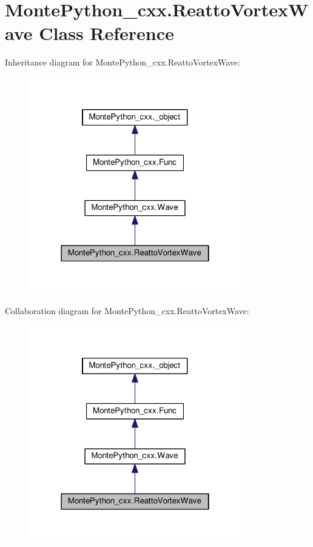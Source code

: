 \hypertarget{classMontePython__cxx_1_1ReattoVortexWave}{}\section{Monte\+Python\+\_\+cxx.\+Reatto\+Vortex\+Wave Class Reference}
\label{classMontePython__cxx_1_1ReattoVortexWave}


Inheritance diagram for Monte\+Python\+\_\+cxx.\+Reatto\+Vortex\+Wave\+:
\nopagebreak
\begin{figure}[H]
\begin{center}
\leavevmode
\includegraphics[width=262pt]{classMontePython__cxx_1_1ReattoVortexWave__inherit__graph}
\end{center}
\end{figure}


Collaboration diagram for Monte\+Python\+\_\+cxx.\+Reatto\+Vortex\+Wave\+:
\nopagebreak
\begin{figure}[H]
\begin{center}
\leavevmode
\includegraphics[width=262pt]{classMontePython__cxx_1_1ReattoVortexWave__coll__graph}
\end{center}
\end{figure}
